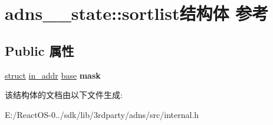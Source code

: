 \hypertarget{structadns____state_1_1sortlist}{}\section{adns\+\_\+\+\_\+state\+:\+:sortlist结构体 参考}
\label{structadns____state_1_1sortlist}
\subsection*{Public 属性}
\begin{DoxyCompactItemize}
\item 
\mbox{\label{structadns____state_1_1sortlist_a0e545d82ad0715b31d268e310ab2cbec}} 
\hyperlink{interfacestruct}{struct} \hyperlink{structin__addr}{in\+\_\+addr} \hyperlink{structbase}{base} {\bfseries mask}
\end{DoxyCompactItemize}


该结构体的文档由以下文件生成\+:\begin{DoxyCompactItemize}
\item 
E\+:/\+React\+O\+S-\/0../sdk/lib/3rdparty/adns/src/internal.\+h\end{DoxyCompactItemize}
